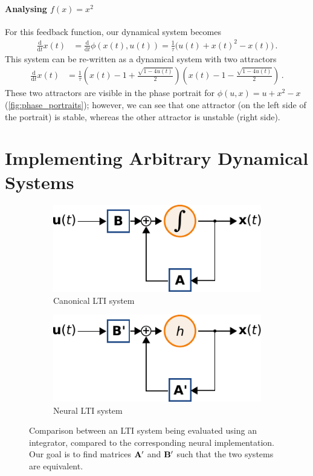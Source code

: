 \documentclass[10pt,letterpaper,oneside]{article}
\begin{document}
\paragraph{Analysing $f(x) = x^2$}
For this feedback function, our dynamical system becomes
\begin{align*}
	\frac{\mathrm{d}}{\mathrm{d}t} x(t) &= \frac{\mathrm{d}}{\mathrm{d}t} \phi(x(t), u(t)) = \frac{1}{\tau} \big(u(t) + x(t)^2 - x(t) \big) \,.	
\end{align*}
This system can be re-written as a dynamical system with two attractors
\begin{align*}
	\frac{\mathrm{d}}{\mathrm{d}t} x(t) &=\frac{1}{\tau} \left( x(t) - 1 + \frac{\sqrt{1 - 4u(t)}}{2} \right) \left( x(t) - 1 - \frac{\sqrt{1 - 4u(t)}}{2} \right) \,.
\end{align*}
These two attractors are visible in the phase portrait for $\phi(u, x) = u + x^2 - x$ (\cref{fig:phase_portraits}); however, we can see that one attractor (on the left side of the portrait) is stable, whereas the other attractor is unstable (right side).

\section{Implementing Arbitrary Dynamical Systems}

\begin{figure}
	\centering%
	\begin{subfigure}{0.5\textwidth}%
		\centering%
		\includegraphics{media/lti_integrator_vs_neural_a.pdf}%
		\caption{Canonical LTI system}%
		\label{fig:lti_integrator_vs_neural_a}%
	\end{subfigure}%
	\begin{subfigure}{0.5\textwidth}%
		\centering%
		\includegraphics{media/lti_integrator_vs_neural_b.pdf}%
		\caption{Neural LTI system}%
		\label{fig:lti_integrator_vs_neural_b}%
	\end{subfigure}
	\caption{Comparison between an LTI system being evaluated using an integrator, compared to the corresponding neural implementation. Our goal is to find matrices ${\mathbf{A}}'$ and ${\mathbf{B}}'$ such that the two systems are equivalent.}
\end{figure}
\end{document}
